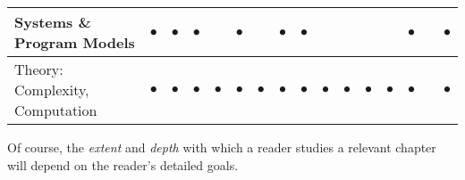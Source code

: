 \begin{tabular}{|l||c|c|c|c|c|c|c|c|c|c|c|c|c|c|c|}
\hline
Systems \& Program Models
  & $\bullet$ & $\bullet$ & $\bullet$ &  & $\bullet$ &  & $\bullet$ & $\bullet$ &  &  &  &  & $\bullet$ & & $\bullet$ \\
\hline
Theory: Complexity, Computation
   & $\bullet$ & $\bullet$ & $\bullet$ & $\bullet$ & $\bullet$ & $\bullet$ & $\bullet$ & $\bullet$ & $\bullet$ & $\bullet$ & $\bullet$ & $\bullet$ & $\bullet$ & & $\bullet$ \\
\hline
\end{tabular}

\bigskip

Of course, the {\em extent} and {\em depth} with which a reader studies a relevant chapter will depend on the reader's detailed goals.






